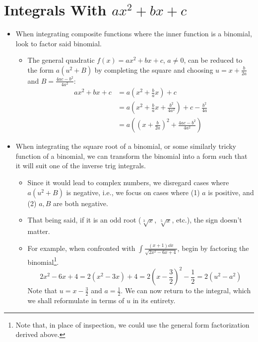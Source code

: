 \documentclass[../main.tex]{subfiles}
\begin{document}
\section{Integrals With \texorpdfstring{$ax^2+bx+c$}{TEXT}}
\begin{itemize}
    \item When integrating composite functions where the inner function is a binomial, look to factor said binomial.
    \begin{itemize}
        \item The general quadratic $f(x)=ax^2+bx+c$, $a\neq 0$, can be reduced to the form $a\left( u^2+B \right)$ by completing the square and choosing $u=x+\frac{b}{2a}$ and $B=\frac{4ac-b^2}{4a^2}$:
        \begin{align*}
            ax^2+bx+c &= a\left( x^2+\frac{b}{a}x \right)+c\\
            &= a\left( x^2+\frac{b}{a}x+\frac{b^2}{4a^2} \right)+c-\frac{b^2}{4a}\\
            &= a\left( \left( x+\frac{b}{2a} \right)^2+\frac{4ac-b^2}{4a^2} \right)
        \end{align*}
    \end{itemize}
    \item When integrating the square root of a binomial, or some similarly tricky function of a binomial, we can transform the binomial into a form such that it will suit one of the inverse trig integrals.
    \begin{itemize}
        \item Since it would lead to complex numbers, we disregard cases where $a\left( u^2+B \right)$ is negative, i.e., we focus on cases where (1) $a$ is positive, and (2) $a,B$ are both negative.
        \item That being said, if it is an odd root ($\sqrt[3]{x}$, $\sqrt[5]{x}$, etc.), the sign doesn't matter.
        \item For example, when confronted with $\int\frac{(x+1)\dd{x}}{\sqrt{2x^2-6x+4}}$, begin by factoring the binomial\footnote{Note that, in place of inspection, we could use the general form factorization derived above.}.
        \begin{equation*}
            2x^2-6x+4 = 2\left( x^2-3x \right)+4
            = 2\left( x-\frac{3}{2} \right)^2-\frac{1}{2}
            = 2\left( u^2-a^2 \right)
        \end{equation*}
        Note that $u=x-\frac{3}{2}$ and $a=\frac{1}{2}$. We can now return to the integral, which we shall reformulate in terms of $u$ in its entirety.

\end{itemize}
\end{itemize}
\end{document}

